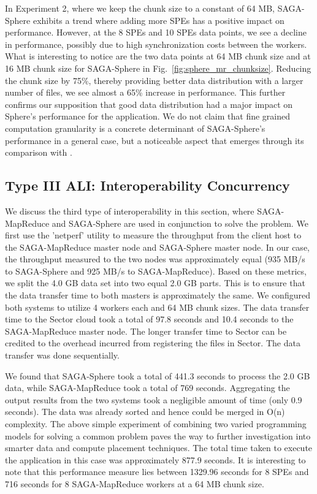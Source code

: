 \documentclass[3p,twocolumn]{elsarticle}
\begin{document}
In Experiment 2, where we keep the chunk size to a constant of 64 MB, SAGA-Sphere 
exhibits a trend where adding more SPEs has a positive impact on performance. However, 
at the 8 SPEs and 10 SPEs data points, we see a decline in performance, possibly 
due to high synchronization costs between the workers. What is interesting to 
notice are the two data points at 64 MB chunk size and at 16 MB chunk size for
SAGA-Sphere in Fig.~\ref{fig:sphere_mr_chunksize}.
Reducing the chunk size by 75\%, 
thereby providing better data distribution with a larger number of files, we 
see almost a 65\% increase in performance. This further confirms our 
supposition that good data distribution had a major impact on Sphere's performance for
the \wc application. We do not claim that fine grained computation 
granularity is a concrete determinant of SAGA-Sphere's performance in a 
general case, but a noticeable aspect that emerges through its comparison with
\sagamapreduce.


\subsection{Type III ALI: Interoperability Concurrency}

We discuss the third type of interoperability in this section,
where SAGA-MapReduce and SAGA-Sphere are used in conjunction 
to solve the \wc problem. We first use the 'netperf' 
utility to measure the throughput from the client host to 
the SAGA-MapReduce master node and SAGA-Sphere master node. 
In our case, the throughput measured to the two nodes was 
approximately equal (935 MB/s to SAGA-Sphere and 925 MB/s to SAGA-MapReduce). 
Based on these metrics, we split the 4.0 GB data set 
into two equal 2.0 GB parts. This is to ensure that the data 
transfer time to both masters is approximately the same. We 
configured both systems to utilize 4 workers each 
and 64 MB chunk sizes. The data transfer time to the Sector 
cloud took a total of 97.8 seconds and 10.4 seconds to the 
SAGA-MapReduce master node. The longer transfer time to Sector 
can be credited to the overhead incurred from registering 
the files in Sector. The data transfer was done sequentially. 

We found that SAGA-Sphere took a total of 441.3 seconds to 
process the 2.0 GB data, while SAGA-MapReduce took a total of 
769 seconds. Aggregating the output results from the two systems 
took a negligible amount of time (only 0.9 seconds). The data was 
already sorted and hence could be merged in O(n) complexity. 
The above simple experiment of combining two varied programming 
models for solving a common problem paves the way to further 
investigation into smarter data and compute placement techniques. 
The total time taken to execute the \wc application in this 
case was approximately 877.9 seconds. It is interesting to 
note that this performance measure lies between 1329.96 seconds 
for 8 SPEs and 716 seconds for 8 SAGA-MapReduce workers at 
a 64 MB chunk size. 
\end{document}
